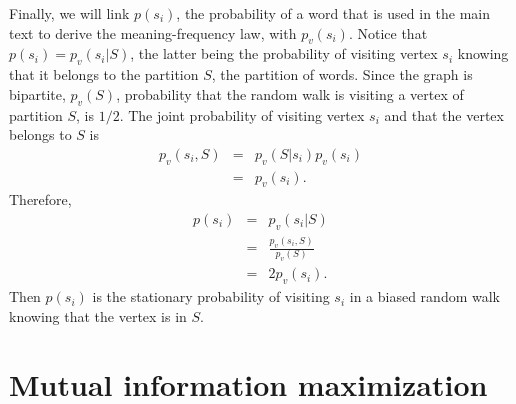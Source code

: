 \documentclass{article}
\begin{document}
Finally, we will link $p(s_i)$, the probability of a word that is used in the main text to derive the meaning-frequency law, with $p_v(s_i)$. Notice that $p(s_i) = p_v(s_i | S)$, the latter being the probability of visiting vertex $s_i$ knowing that it belongs to the partition $S$, the partition of words.
Since the graph is bipartite, $p_v(S)$, probability that the random walk is visiting a vertex of partition $S$, is $1/2$. The joint probability of visiting vertex $s_i$ and that the vertex belongs to $S$ is 
\begin{eqnarray*}
p_{v}(s_i, S) & = & p_v(S|s_i)p_v(s_i) \\
              & = & p_v(s_i).
\end{eqnarray*}
Therefore, 
\begin{eqnarray*}
p(s_i) & = & p_{v}(s_i | S) \\
       & = & \frac{p_{v}(s_i, S)}{p_{v}(S)} \\
       & = & 2 p_{v}(s_i).
\end{eqnarray*} 
Then $p(s_i)$ is the stationary probability of visiting $s_i$ in a biased random walk knowing that the vertex is in $S$. 


% 

\section{Mutual information maximization} 
\label{mutual_information_maximixation_appendix}
\end{document}

